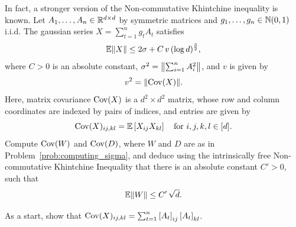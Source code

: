 \begin{myexercise}\label{prob:strong_NCK}
    In fact, a stronger version of the Non-commutative Khintchine inequality is known. Let $A_1, \ldots, A_n \in \mathbb{R}^{d \times d}$ by symmetric matrices and $g_1, \ldots, g_n \in \mathbb{N}(0,1)$ i.i.d. The gaussian series $X = \sum_{t=1}^n g_t A_t$ satisfies
    \begin{equation*}
        \mathbb{E}{\left\lVert{X}\right\rVert} \leq 2 \sigma + C\,v\,(\log d)^{\frac{3}{2}},
    \end{equation*}
    where $C > 0$ is an absolute constant, $\sigma^2 = {\left\lVert{ \sum_{i=1}^n A_i^2}\right\rVert}$, and $v$ is given by
    \begin{equation*}
        v^2 = {\left\lVert{\operatorname{Cov}(X)}\right\rVert}.
    \end{equation*}
    Here, matrix covariance $\operatorname{Cov}(X)$ is a $d^2 \times d^2$ matrix, whose row and column coordinates are indexed by pairs of indices, and entries are given by
    \begin{equation*}
        \operatorname{Cov}(X)_{ij,kl} = \mathbb{E}\left[ X_{ij}X_{kl} \right] \quad\text{for }i,j,k,l\in[d].
    \end{equation*}
    Compute $\operatorname{Cov}(W)$ and $\operatorname{Cov}(D)$, where $W$ and $D$ are as in Problem~\ref{prob:computing_sigma}, and deduce using the intrinsically free Non-commutative Khintchine Inequality that there is an absolute constant $C' > 0$, such that
    \begin{equation*}
        \mathbb{E}{\left\lVert{W}\right\rVert} \leq C'\,\sqrt{d}.
    \end{equation*}
\end{myexercise}
\begin{hint}
    As a start, show that $\operatorname{Cov}(X)_{ij,kl} = \sum_{t=1}^n \left[ A_t \right]_{ij} \left[ A_t \right]_{kl}$.
\end{hint}

